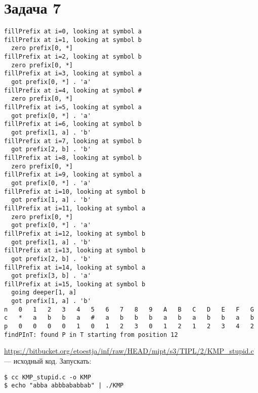 \documentclass[a4paper]{article}
\begin{document}
\section*{Задача 7}
\begin{verbatim}
fillPrefix at i=0, looking at symbol a
fillPrefix at i=1, looking at symbol b
  zero prefix[0, *]
fillPrefix at i=2, looking at symbol b
  zero prefix[0, *]
fillPrefix at i=3, looking at symbol a
  got prefix[0, *] . 'a'
fillPrefix at i=4, looking at symbol #
  zero prefix[0, *]
fillPrefix at i=5, looking at symbol a
  got prefix[0, *] . 'a'
fillPrefix at i=6, looking at symbol b
  got prefix[1, a] . 'b'
fillPrefix at i=7, looking at symbol b
  got prefix[2, b] . 'b'
fillPrefix at i=8, looking at symbol b
  zero prefix[0, *]
fillPrefix at i=9, looking at symbol a
  got prefix[0, *] . 'a'
fillPrefix at i=10, looking at symbol b
  got prefix[1, a] . 'b'
fillPrefix at i=11, looking at symbol a
  zero prefix[0, *]
  got prefix[0, *] . 'a'
fillPrefix at i=12, looking at symbol b
  got prefix[1, a] . 'b'
fillPrefix at i=13, looking at symbol b
  got prefix[2, b] . 'b'
fillPrefix at i=14, looking at symbol a
  got prefix[3, b] . 'a'
fillPrefix at i=15, looking at symbol b
  going deeper[1, a]
  got prefix[1, a] . 'b'
n	0	1	2	3	4	5	6	7	8	9	A	B	C	D	E	F	G	
c	*	a	b	b	a	#	a	b	b	b	a	b	a	b	b	a	b	
p	0	0	0	0	1	0	1	2	3	0	1	2	1	2	3	4	2	
findPInT: found P in T starting from position 12
\end{verbatim}
\href{https://bitbucket.org/etoestja/inf/raw/HEAD/mipt/s3/TIPL/2/KMP\_stupid.c}{https://bitbucket.org/etoestja/inf/raw/HEAD/mipt/s3/TIPL/2/KMP\_stupid.c}~--- исходный код. Запускать:
\begin{verbatim}
$ cc KMP_stupid.c -o KMP
$ echo "abba abbbababbab" | ./KMP
\end{verbatim}
\end{document}

